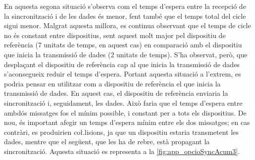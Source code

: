 \documentclass{tfgitic}[2024/07/01]
\begin{document}
{En aquesta segona situació s'observa com el temps d'espera entre la recepció de la sincronització i de les dades és menor, fent també que el temps total del cicle sigui menor. Malgrat aquesta millora, es continua observant que el temps de cicle no és constant entre dispositius, sent aquest molt major pel dispositiu de referència (7 unitats de temps, en aquest cas) en comparació amb el dispositiu que inicia la transmissió de dades (2 unitats de temps). S'ha observat, però, que desplaçant el dispositiu de referència cap al que inicia la transmissió de dades s'aconsegueix reduir el temps d'espera. Portant aquesta situació a l'extrem, es podria pensar en utilitzar com a dispositiu de referència el que inicia la transmissió de dades. En aquest cas, el dispositiu de referència enviaria la sincronització i, seguidament, les dades. Això faria que el temps d'espera entre ambdós missatges fos el mínim possible, i constant per a tots els dispositius. De nou, és important afegir un temps d'espera mínim entre els dos missatges; en cas contràri, es produirien co\l.lisions, ja que un dispositiu estaria transmetent les dades, mentre que el següent, que les ha de rebre, està propagant la sincronització. Aquesta situació es representa a la \autoref{fig:app_opcioSyncAcum3}.

\begin{figure}[ht]
    \centering
\setlength{\extrarowheight}{0pt}
\addtolength{\extrarowheight}{\aboverulesep}
\addtolength{\extrarowheight}{\belowrulesep}
\setlength{\aboverulesep}{0pt}
\setlength{\belowrulesep}{0pt}
\end{figure}}
\end{document}
